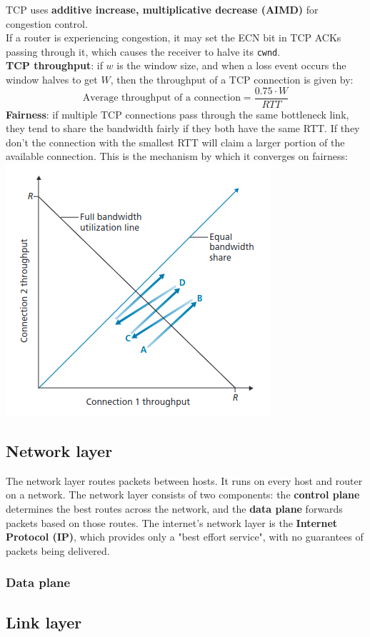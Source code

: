 TCP uses \textbf{additive increase, multiplicative decrease (AIMD)} for congestion control.\\
If a router is experiencing congestion, it may set the ECN bit in TCP ACKs passing through it, which causes the receiver to halve its \verb|cwnd|.\\
\textbf{TCP throughput}: if $w$ is the window size, and when a loss event occurs the window halves to get $W$, then the throughput of a TCP connection is given by:
$$
	\text{Average throughput of a connection}=\frac{0.75\cdot W}{RTT}
$$
\textbf{Fairness}: if multiple TCP connections pass through the same bottleneck link, they tend to share the bandwidth fairly if they both have the same RTT. If they don't the connection with the smallest RTT will claim a larger portion of the available connection. This is the mechanism by which it converges on fairness:
\includegraphics[width=\linewidth]{../images/w5n4tcpFairness.png}\\

\subsection{Network layer}
The network layer routes packets between hosts. It runs on every host and router on a network. The network layer consists of two components: the \textbf{control plane} determines the best routes across the network, and the \textbf{data plane} forwards packets based on those routes. The internet's network layer is the \textbf{Internet Protocol (IP)}, which provides only a "best effort service", with no guarantees of packets being delivered.\\

\subsubsection{Data plane}


\subsection{Link layer}
